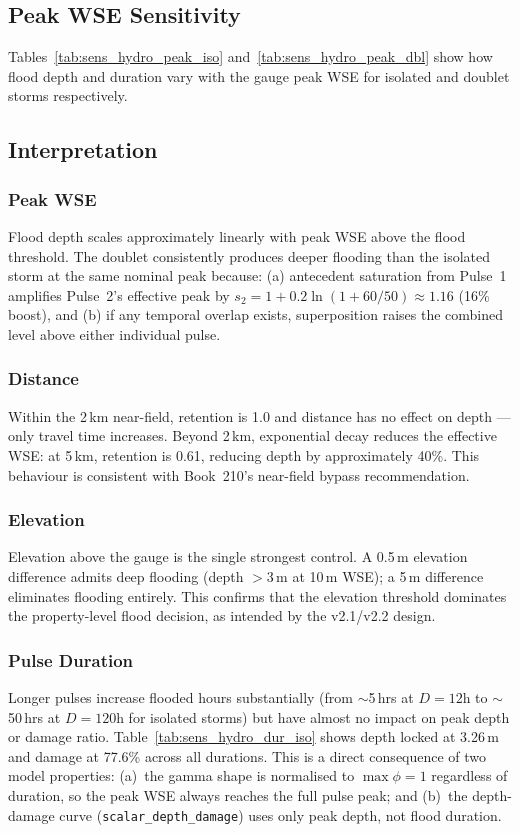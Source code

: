 \documentclass[11pt,a4paper]{article}
\begin{document}
\subsection{Peak WSE Sensitivity}

Tables~\ref{tab:sens_hydro_peak_iso} and~\ref{tab:sens_hydro_peak_dbl} show how
flood depth and duration vary with the gauge peak WSE for isolated and doublet
storms respectively.



\subsection{Interpretation}

\subsubsection{Peak WSE}
Flood depth scales approximately linearly with peak WSE above the flood threshold.
The doublet consistently produces deeper flooding than the isolated storm at the
same nominal peak because: (a) antecedent saturation from Pulse~1 amplifies Pulse~2's
effective peak by $s_2 = 1 + 0.2\ln(1 + 60/50) \approx 1.16$ (16\% boost), and
(b) if any temporal overlap exists, superposition raises the combined level above
either individual pulse.

\subsubsection{Distance}
Within the 2\,km near-field, retention is 1.0 and distance has no effect on depth
--- only travel time increases.  Beyond 2\,km, exponential decay reduces the
effective WSE: at 5\,km, retention is 0.61, reducing depth by approximately 40\%.
This behaviour is consistent with Book~210's near-field bypass recommendation.

\subsubsection{Elevation}
Elevation above the gauge is the single strongest control.  A 0.5\,m elevation
difference admits deep flooding (depth $>$3\,m at 10\,m WSE); a 5\,m difference
eliminates flooding entirely.  This confirms that the elevation threshold
dominates the property-level flood decision, as intended by the v2.1/v2.2 design.

\subsubsection{Pulse Duration}
Longer pulses increase flooded hours substantially (from $\sim$5\,hrs at $D=12$h
to $\sim$50\,hrs at $D=120$h for isolated storms) but have almost no impact on
peak depth or damage ratio.  Table~\ref{tab:sens_hydro_dur_iso} shows depth locked
at 3.26\,m and damage at 77.6\% across all durations.  This is a direct consequence
of two model properties: (a)~the gamma shape is normalised to $\max\phi = 1$
regardless of duration, so the peak WSE always reaches the full pulse peak; and
(b)~the depth-damage curve (\texttt{scalar\_depth\_damage}) uses only peak depth,
not flood duration.
\end{document}
